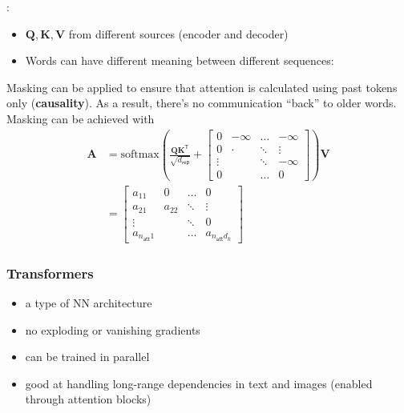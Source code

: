 \newpar{}
:

\begin{itemize}
    \item $\mathbf{Q,K,V}$ from different sources (encoder and decoder)
    \item Words can have different meaning between different sequences:
\end{itemize}

\newpar{}

Masking can be applied to ensure that attention is calculated using past tokens only (\textbf{causality}). As a result, there's no communication ``back'' to older words.
Masking can be achieved with
\noindent\begin{align*}
    \mathbf{A} & = \mathrm{softmax}\left(\frac{\mathbf{QK}^{\mathsf{T}}}{\sqrt{d_{\mathsf{rep}}}}+
    \begin{bmatrix}
        0      & -\infty & \hdots & -\infty \\
        0      & \cdot   & \ddots & \vdots  \\
        \vdots &         & \ddots & -\infty \\
        0      &         & \hdots & 0
    \end{bmatrix}
    \right)\mathbf{V}                                                                                                      \\
               & =  \begin{bmatrix}
                        a_{11}                & 0      & \hdots & 0                                    \\
                        a_{21}                & a_{22} & \ddots & \vdots                               \\
                        \vdots                &        & \ddots & 0                                    \\
                        a_{n_{\mathsf{att}}1} &        & \hdots & a_{n_{\mathsf{att}}d_k}
                    \end{bmatrix}
\end{align*}

\newcol{}
\subsubsection{Transformers}
\begin{itemize}
    \item a type of NN architecture
    \item no exploding or vanishing gradients
    \item can be trained in parallel
    \item good at handling long-range dependencies in text and images (enabled through attention blocks)
\end{itemize}
